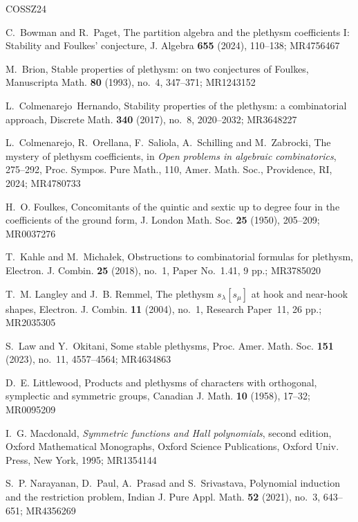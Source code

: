 \documentclass[reqno]{amsart}
\theoremstyle{plain}
\theoremstyle{definition}
\theoremstyle{remark}
\theoremstyle{plain}
\begin{document}
\begin{thebibliography}{COSSZ24}

 C.~Bowman and R.~Paget, The partition algebra and the
plethysm coefficients I: Stability and Foulkes' conjecture, J. Algebra {\bf 655}
(2024), 110--138; MR4756467

 M.~Brion, Stable properties of plethysm: on two
conjectures of Foulkes, Manuscripta Math. {\bf 80} (1993), no.~4, 347--371;
MR1243152

 L.~Colmenarejo~Hernando, Stability
properties of the plethysm: a combinatorial approach, Discrete Math. {\bf 340}
(2017), no.~8, 2020--2032; MR3648227

 L.~Colmenarejo, R.~Orellana, F.~Saliola, A.~Schilling and M.~Zabrocki, The mystery of plethysm
coefficients, in {\it Open problems in algebraic combinatorics}, 275--292,
Proc. Sympos. Pure Math., 110, Amer. Math. Soc., Providence, RI, 2024;
MR4780733

 H.~O. Foulkes, Concomitants of the quintic and sextic
up to degree four in the coefficients of the ground form, J. London Math. Soc.
{\bf 25} (1950), 205--209; MR0037276

 T.~Kahle and M.~Micha\l ek, Obstructions to
combinatorial formulas for plethysm, Electron. J. Combin. {\bf 25} (2018),
no.~1, Paper No.~1.41, 9 pp.; MR3785020

 T.~M. Langley and J.~B. Remmel, The plethysm
$s_\lambda[s_\mu]$ at hook and near-hook shapes, Electron. J. Combin. {\bf 11}
(2004), no.~1, Research Paper~11, 26 pp.; MR2035305

 S.~Law and Y.~Okitani, Some stable plethysms, Proc.
Amer. Math. Soc. {\bf 151} (2023), no.~11, 4557--4564; MR4634863

 D.~E. Littlewood, Products and plethysms of
characters with orthogonal, symplectic and symmetric groups, Canadian J. Math.
{\bf 10} (1958), 17--32; MR0095209

 I.~G. Macdonald, {\it Symmetric functions and Hall
polynomials}, second edition, Oxford Mathematical Monographs, Oxford Science
Publications, Oxford Univ. Press, New York, 1995; MR1354144

 S.~P. Narayanan, D.~Paul, A.~Prasad and S.~Srivastava, Polynomial induction and
the restriction problem, Indian J. Pure Appl. Math. {\bf 52} (2021), no.~3,
643--651; MR4356269


\end{thebibliography}
\end{document}
